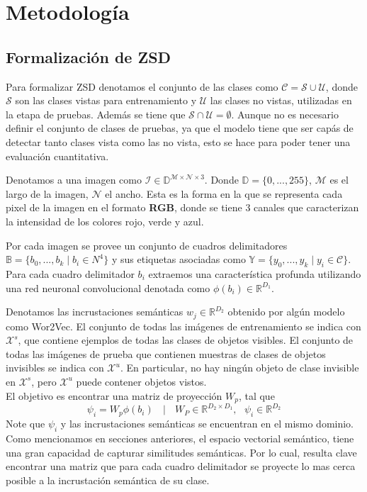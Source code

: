 \chapter{Metodología}\label{cap:metodologia}

\section{Formalización de ZSD} \label{ssec:formalizaciondezsd}
Para formalizar ZSD denotamos el conjunto de las clases como $\mathcal{C} = \mathcal{S} \cup \mathcal{U}$, donde $\mathcal{S}$ son las clases vistas para entrenamiento y $\mathcal{U}$ las clases no vistas, utilizadas en la etapa de pruebas. Además se tiene que $\mathcal{S} \cap \mathcal{U} = \emptyset$. Aunque no es necesario definir el conjunto de clases de pruebas, ya que el modelo tiene que ser capás de detectar tanto clases vista como las no vista, esto se hace para poder tener una evaluación cuantitativa.

Denotamos a una imagen como $\mathcal{I} \in \mathbb{D}^{\mathcal{M} \times \mathcal{N} \times 3}$. Donde $\mathbb{D} = \{0,...,255\}$, $\mathcal{M}$  es el largo de la imagen, $\mathcal{N}$ el ancho. Esta es la forma en la que se representa cada pixel de la imagen en el formato \textbf{RGB}, donde se tiene 3 canales que caracterizan la intensidad de los colores rojo, verde y azul. 

Por cada imagen se provee un conjunto de cuadros delimitadores  $\mathbb{B} = \{b_0,...,b_k\mid b_i \in N^4\}$ y sus etiquetas asociadas como $\mathbb{Y} = \{y_0,...,y_k\mid y_i \in \mathcal{C}\}$. Para cada cuadro delimitador $b_i$ extraemos una característica profunda utilizando una red neuronal convolucional denotada como $\phi(b_i) \in \mathbb{R}^{D_1}$. 

Denotamos las incrustaciones semánticas $w_j \in  \mathbb{R}^{D_2}$ obtenido por algún modelo como Wor2Vec. El conjunto de todas las imágenes de entrenamiento se indica con $\mathcal{X}^s$, que contiene ejemplos de todas las clases de objetos visibles.  El conjunto de todas las imágenes de prueba que contienen muestras de clases de objetos invisibles se indica con  $\mathcal{X}^u$. En particular, no hay ningún objeto de clase invisible en $\mathcal{X}^s$, pero $\mathcal{X}^u$ puede contener objetos vistos.\\

El objetivo es encontrar una matriz de proyección $W_p$, tal que \[ \psi_i = W_p\phi(b_i) \:\:\:\mid\:\:\: W_P \in \mathbb{R}^{D_2 \times D_1},\:\:\: \psi_i \in \mathbb{R}^{D_2} \] Note que $\psi_i$ y las incrustaciones semánticas se encuentran en el mismo dominio. Como mencionamos en secciones anteriores, el espacio vectorial semántico, tiene una gran capacidad de capturar similitudes semánticas. Por lo cual, resulta clave encontrar una matriz que para cada cuadro delimitador se proyecte lo mas cerca posible a la incrustación semántica de su clase. 

